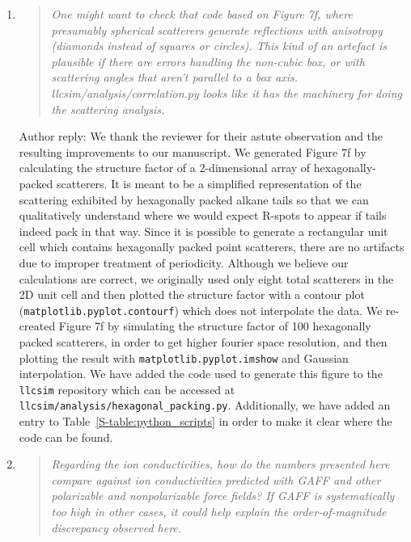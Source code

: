 \documentclass{article}
\begin{document}
\begin{enumerate}
    \item \begin{quote}
    \textit{One might want to check that code based on Figure 7f, where
	    presumably spherical scatterers generate reflections with anisotropy (diamonds
	    instead of squares or circles). This kind of an artefact is plausible if there
	    are errors handling the non-cubic box, or with scattering angles that aren't
	    parallel to a box axis. llcsim/analysis/correlation.py looks like it has the
	    machinery for doing the scattering analysis.}
    \end{quote}
	
    Author reply: We thank the reviewer for their astute observation and
    the resulting improvements to our manuscript. We generated Figure 7f by
    calculating the structure factor of a 2-dimensional array of hexagonally-packed
    scatterers. It is meant to be a simplified representation of the scattering
    exhibited by hexagonally packed alkane tails so that we can qualitatively
    understand where we would expect R-spots to appear if tails indeed pack in that
    way. Since it is possible to generate a rectangular unit cell which contains
    hexagonally packed point scatterers, there are no artifacts due to improper
    treatment of periodicity.  Although we believe our calculations are correct, we
    originally used only eight total scatterers in the 2D unit cell and then
    plotted the structure factor with a contour plot
    (\texttt{matplotlib.pyplot.contourf}) which does not interpolate the data. We
    re-created Figure 7f by simulating the structure factor of 100 hexagonally
    packed scatterers, in order to get higher fourier space resolution, and then
    plotting the result with \texttt{matplotlib.pyplot.imshow} and Gaussian
    interpolation. We have added the code used to generate this figure to the
    \texttt{llcsim} repository which can be accessed at
    \texttt{llcsim/analysis/hexagonal\_packing.py}.
    Additionally, we have added an entry to Table~\ref{S-table:python_scripts} in 
    order to make it clear where the code can be found.

    \item \begin{quote}	
    \textit{Regarding the ion conductivities, how do the numbers presented here
	    compare against ion conductivities predicted with GAFF and other polarizable
	    and nonpolarizable force fields? If GAFF is systematically too high in other
	    cases, it could help explain the order-of-magnitude discrepancy observed here.}
    \end{quote}


\end{enumerate}
\end{document}
